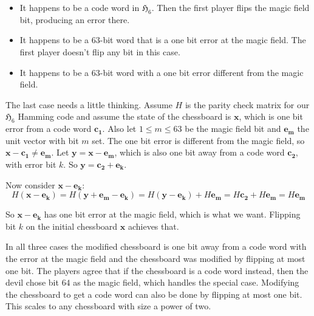 \begin{itemize}
\item  It happens to be a code word in $\mathfrak{H}_6$. Then the first player flips the magic field bit, producing an error there.

\item It happens to be a $63$-bit word that is a one bit error at the magic field. The first player doesn't flip any bit in this case.

\item It happens to be a $63$-bit word with a one bit error different from the magic field.
\end{itemize}

The last case needs a little thinking. Assume $H$ is the parity check matrix for our $\mathfrak{H}_6$ Hamming code and assume the state of the chessboard is $\bm{x}$, which is one bit error from a code word $\bm{c_1}$. Also let $1 \leq m \leq 63$ be the magic field bit and $\bm{e_m}$ the unit vector with bit $m$ set. The one bit error is different from the magic field, so $\bm{x} - \bm{c_1} \neq \bm{e_m}$. Let $\bm{y} = \bm{x} - \bm{e_m}$, which is also one bit away from a code word $\bm{c_2}$, with error bit $k$. So 
$\bm{y} = \bm{c_2} + \bm{e_k}$.

Now consider $\bm{x} - \bm{e_k}$:
$$
H (\bm{x} - \bm{e_k}) = H (\bm{y} + \bm{e_m} - \bm{e_k}) = H (\bm{y} - \bm{e_k}) + H \bm{e_m} = H \bm{c_2} + H \bm{e_m} = H \bm{e_m}
$$

So $\bm{x} - \bm{e_k}$ has one bit error at the magic field, which is what we want. Flipping bit $k$ on the initial chessboard $\bm{x}$ achieves that.

In all three cases the modified chessboard is one bit away from a code word with the error at the magic field and the chessboard was modified by flipping at most one bit. The players agree that if the chessboard is a code word instead, then the devil chose bit $64$ as the magic field, which handles the special case. Modifying the chessboard to get a code word can also be done by flipping at most one bit. This scales to any chessboard with size a power of two.

